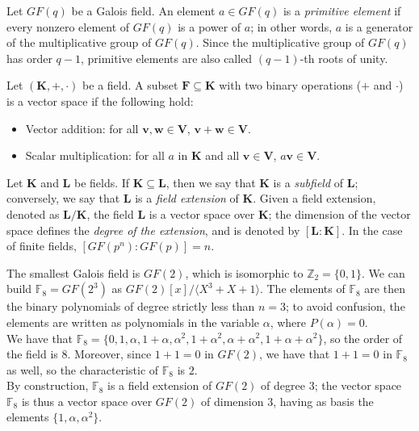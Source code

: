\begin{definition}
    Let $GF(q)$ be a Galois field. An element $a \in GF(q)$ is a \emph{primitive element} if every nonzero element of $GF(q)$ is a power of $a$;
    in other words, $a$ is a generator of the multiplicative group of $GF(q)$. Since the multiplicative group of $GF(q)$ has order $q-1$,
    primitive elements are also called $(q-1)$-th roots of unity.
\end{definition}
\newpage
\begin{definition}
    Let $(\mathbf{K}, +, \cdot)$ be a field. A subset $\mathbf{F} \subseteq \mathbf{K}$ with two binary operations ($+$ and $\cdot$) is a 
    vector space if the following hold:
    \begin{itemize}
        \item Vector addition: for all $\mathbf{v}, \mathbf{w} \in \mathbf{V}$, $\mathbf{v} + \mathbf{w} \in \mathbf{V}$.
        \item Scalar multiplication: for all $a$ in $\mathbf{K}$ and all $\mathbf{v} \in \mathbf{V}$, $a\mathbf{v} \in \mathbf{V}$.
    \end{itemize}
\end{definition}

\begin{definition}
    Let $\mathbf{K}$ and $\mathbf{L}$ be fields. If $\mathbf{K} \subseteq \mathbf{L}$, then we say that $\mathbf{K}$ is a \emph{subfield} of $\mathbf{L}$; conversely, 
    we say that $\mathbf{L}$ is a \emph{field extension} of $\mathbf{K}$.
    Given a field extension, denoted as $\mathbf{L}/\mathbf{K}$, the field $\mathbf{L}$ is a vector space over $\mathbf{K}$; the dimension of the vector space
    defines the \emph{degree of the extension}, and is denoted by $[\mathbf{L}:\mathbf{K}]$. In the case of finite fields, 
    $[GF(p^n):GF(p)] = n$.
\end{definition}

\begin{example}
    The smallest Galois field is $GF(2)$, which is isomorphic to $\mathds{Z}_2 = \{0,1\}$.
    We can build $\mathds{F}_8 = GF(2^3)$ as $GF(2)[x]/\langle X^3+X+1\rangle$.
    The elements of $\mathds{F}_8$ are then the binary polynomials of degree strictly less than $n=3$; to avoid confusion, 
    the elements are written as polynomials in the variable $\alpha$, where $P(\alpha) = 0$.\\
    We have that $\mathds{F}_8 = \{0, 1, \alpha, 1+\alpha, \alpha^2, 1+\alpha^2, \alpha + \alpha^2, 1+\alpha+\alpha^2\}$, so the order of the field is $8$.
    Moreover, since $1+1=0$ in $GF(2)$, we have that $1+1=0$ in $\mathds{F}_8$ as well, so the characteristic of $\mathds{F}_8$ is $2$.\\
    By construction, $\mathds{F}_8$ is a field extension of $GF(2)$ of degree $3$; the vector space $\mathds{F}_8$ is thus a vector space over $GF(2)$ of dimension $3$,
    having as basis the elements $\{1, \alpha, \alpha^2\}$.
\end{example}

